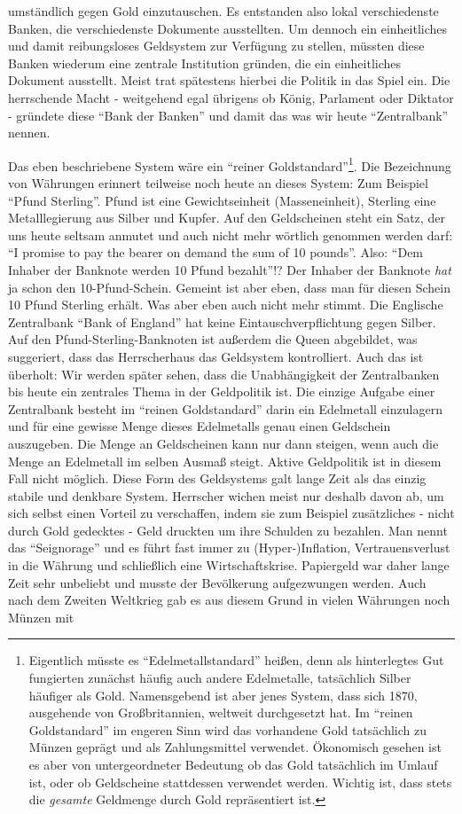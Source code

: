 umständlich gegen Gold einzutauschen. Es entstanden also lokal verschiedenste Banken, die verschiedenste Dokumente ausstellten. Um dennoch ein einheitliches und damit reibungsloses Geldsystem zur Verfügung zu stellen, müssten diese Banken wiederum eine zentrale Institution gründen, die ein einheitliches Dokument ausstellt. Meist trat spätestens hierbei die Politik in das Spiel ein. Die herrschende Macht - weitgehend egal übrigens ob König, Parlament oder Diktator - gründete diese "`Bank der Banken"' und damit das was wir heute "`Zentralbank"' nennen.

Das eben beschriebene System wäre ein "`reiner Goldstandard"'\footnote{Eigentlich müsste es "`Edelmetallstandard"' heißen, denn als hinterlegtes Gut fungierten zunächst häufig auch andere Edelmetalle, tatsächlich Silber häufiger als Gold. Namensgebend ist aber jenes System, dass sich 1870, ausgehende von Großbritannien, weltweit durchgesetzt hat. Im "`reinen Goldstandard"' im engeren Sinn wird das vorhandene Gold tatsächlich zu Münzen geprägt und als Zahlungsmittel verwendet. Ökonomisch gesehen ist es aber von untergeordneter Bedeutung ob das Gold tatsächlich im Umlauf ist, oder ob Geldscheine stattdessen verwendet werden. Wichtig ist, dass stets die \textit{gesamte} Geldmenge durch Gold repräsentiert ist.}. Die Bezeichnung von Währungen erinnert teilweise noch heute an dieses System: Zum Beispiel "`Pfund Sterling"'. Pfund ist eine Gewichtseinheit (Masseneinheit), Sterling eine Metalllegierung aus Silber und Kupfer. Auf den Geldscheinen steht ein Satz, der uns heute seltsam anmutet und auch nicht mehr wörtlich genommen werden darf: "`I promise to pay the bearer on demand the sum of 10 pounds"'. Also: "`Dem Inhaber der Banknote werden 10 Pfund bezahlt"'!? Der Inhaber der Banknote \textit{hat} ja schon den 10-Pfund-Schein. Gemeint ist aber eben, dass man für diesen Schein 10 Pfund Sterling erhält. Was aber eben auch nicht mehr stimmt. Die Englische Zentralbank "`Bank of England"' hat keine Eintauschverpflichtung gegen Silber. Auf den Pfund-Sterling-Banknoten ist außerdem die Queen abgebildet, was suggeriert, dass das Herrscherhaus das Geldsystem kontrolliert. Auch das ist überholt: Wir werden später sehen, dass die Unabhängigkeit der Zentralbanken bis heute ein zentrales Thema in der Geldpolitik ist. Die einzige Aufgabe einer Zentralbank besteht im "`reinen Goldstandard"' darin ein Edelmetall einzulagern und für eine gewisse Menge dieses Edelmetalls genau einen Geldschein auszugeben. Die Menge an Geldscheinen kann nur dann steigen, wenn auch die Menge an Edelmetall im selben Ausmaß steigt. Aktive Geldpolitik ist in diesem Fall nicht möglich. Diese Form des Geldsystems galt lange Zeit als das einzig stabile und denkbare System. Herrscher wichen meist nur deshalb davon ab, um sich selbst einen Vorteil zu verschaffen, indem sie zum Beispiel zusätzliches - nicht durch Gold gedecktes - Geld druckten um ihre Schulden zu bezahlen. Man nennt das "`Seignorage"' und es führt fast immer zu (Hyper-)Inflation, Vertrauensverlust in die Währung und schließlich eine Wirtschaftskrise. Papiergeld war daher lange Zeit sehr unbeliebt und musste der Bevölkerung aufgezwungen werden. Auch nach dem Zweiten Weltkrieg gab es aus diesem Grund in vielen Währungen noch Münzen mit 